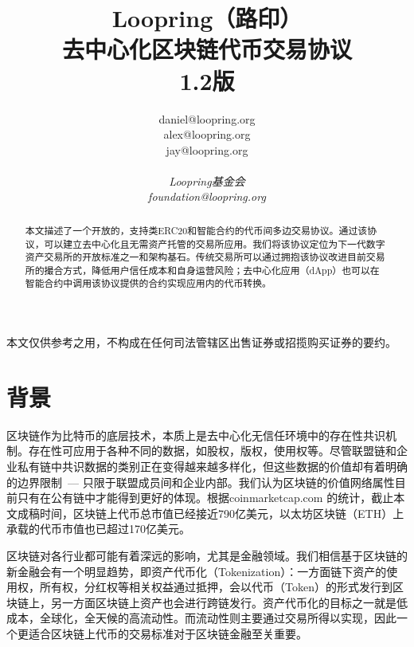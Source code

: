 \documentclass[UTF8,nofonts]{ctexart}
\title{\textbf{Loopring（路印）}\\\textbf{去中心化区块链代币交易协议}\\1.2版}
\author{
    daniel@loopring.org\\
    alex@loopring.org\\
    jay@loopring.org  \\
    \\
  \textit{Loopring基金会}\\
  \textit{foundation@loopring.org}\\
}
\begin{document}
\maketitle

本文仅供参考之用，不构成在任何司法管辖区出售证券或招揽购买证券的要约。 

\begin{abstract}
本文描述了一个开放的，支持类ERC20和智能合约的代币间多边交易协议。通过该协议，可以建立去中心化且无需资产托管的交易所应用。我们将该协议定位为下一代数字资产交易所的开放标准之一和架构基石。传统交易所可以通过拥抱该协议改进目前交易所的撮合方式，降低用户信任成本和自身运营风险；去中心化应用（dApp）也可以在智能合约中调用该协议提供的合约实现应用内的代币转换。

\end{abstract}

\newpage

\tableofcontents
\newpage

\section{背景\label{sec:background}}

区块链\cite{staff2016blockchains}\cite{swan2015blockchain}作为比特币\cite{nakamoto2008bitcoin}的底层技术，本质上是去中心化无信任环境中的存在性共识机制\cite{lamport1982byzantine}\cite{christidis2016blockchains}。存在性可应用于各种不同的数据，如股权，版权，使用权等。尽管联盟链和企业私有链中共识数据的类别正在变得越来越多样化，但这些数据的价值却有着明确的边界限制\ --- 只限于联盟成员间和企业内部。我们认为区块链的价值网络属性目前只有在公有链中才能得到更好的体现。根据coinmarketcap.com 的统计，截止本文成稿时间，区块链上代币总市值已经接近790亿美元，以太坊区块链\cite{wood2014ethereum}（ETH）上承载的代币市值也已超过170亿美元。

区块链对各行业都可能有着深远的影响，尤其是金融领域。我们相信基于区块链的新金融会有一个明显趋势，即资产代币化（Tokenization）\cite{liu2016medical}\cite{christidis2016blockchains}：一方面链下资产的使用权，所有权，分红权等相关权益通过抵押，会以代币（Token）\cite{swan2015blockchain}的形式发行到区块链上，另一方面区块链上资产也会进行跨链发行。资产代币化的目标之一就是低成本，全球化，全天候的高流动性。而流动性则主要通过交易所得以实现，因此一个更适合区块链上代币的交易标准对于区块链金融至关重要。
\end{document}
